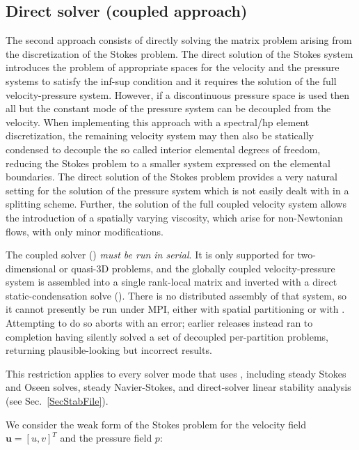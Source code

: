 \subsection{Direct solver (coupled approach)}
\label{DirectSolv}
The second approach consists of directly solving the matrix problem
arising from the discretization of the Stokes problem.  The direct
solution of the Stokes system introduces the problem of appropriate
spaces for the velocity and the pressure systems to satisfy the
inf-sup condition and it requires the solution of the full
velocity-pressure system. However, if a discontinuous pressure space
is used then all but the constant mode of the pressure system can be
decoupled from the velocity. When implementing this
approach with a spectral/hp element discretization, the remaining
velocity system may then also be statically condensed to decouple the so
called interior elemental degrees of freedom, reducing the Stokes
problem to a smaller system expressed on the elemental boundaries. The
direct solution of the Stokes problem provides a very natural setting
for the solution of the pressure system which is not easily dealt with
in a splitting scheme. Further, the solution of the full coupled
velocity system allows the introduction of a spatially varying
viscosity, which arise for non-Newtonian flows, with only minor
modifications.

\begin{warningbox}
  The coupled solver () \emph{must be run in
  serial}. It is only supported for two-dimensional or quasi-3D problems, and
  the globally coupled velocity-pressure system is assembled into a single
  rank-local matrix and inverted with a direct static-condensation solve
  (). There is no distributed assembly of that system,
  so it cannot presently be run under MPI, either with spatial partitioning or
  with . Attempting to do so aborts with an error; earlier
  releases instead ran to completion having silently solved a set of decoupled
  per-partition problems, returning plausible-looking but incorrect results.

  This restriction applies to every solver mode that uses
  , including steady Stokes and Oseen solves, steady
  Navier-Stokes, and direct-solver linear stability analysis (see
  Sec.~\ref{SecStabFile}).
\end{warningbox}

We consider the weak form of the Stokes problem for the velocity field
$\boldsymbol{u}=[u,v]^{T}$ and the pressure field $p$:

